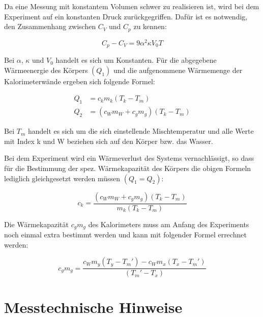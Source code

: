 Da eine Messung mit konstantem Volumen schwer zu realisieren ist, wird bei dem
Experiment auf ein konstanten Druck zurückgegriffen. Dafür ist es notwendig, den
Zusammenhang zwischen $C_V$ und $C_p$ zu kennen:

\begin{equation}
  \label{eqn:Cp-CV}
  C_p - C_V = 9 \alpha^2 \kappa V_0 T
\end{equation}

Bei $\alpha$, $\kappa$ und $V_0$ handelt es sich um Konstanten. Für die abgegebene
Wärmeenergie des Körpers $(Q_1)$ und die aufgenommene Wärmemenge der Kalorimeterwände
ergeben sich folgende Formel:

\begin{align}
  Q_1 &= c_k m_k (T_k - T_m) \\
  Q_2 &= (c_W m_W + c_g m_g) (T_k - T_m)
\end{align}

Bei $T_m$ handelt es sich um die sich einstellende Mischtemperatur und alle Werte
mit Index k und W beziehen sich auf den Körper bzw. das Wasser.

Bei dem Experiment wird ein Wärmeverlust des Systems vernachlässigt, so dass
für die Bestimmung der spez. Wärmekapazität des Körpers die obigen Formeln
lediglich gleichgesetzt werden müssen $(Q_1=Q_2)$:

\begin{equation}
  \label{eqn:ck}
  c_k = \frac{(c_W m_W + c_g m_g) (T_k - T_m)}{m_k (T_k - T_m)}
\end{equation}

Die Wärmekapazität $c_g m_g$ des Kalorimeters muss am Anfang des Experiments
noch einmal extra bestimmt werden und kann mit folgender Formel errechnet werden:

\begin{equation}
  \label{eqn:cgmg}
  c_g m_g = \frac{c_W m_y \left(T_y - T_m' \right) - c_W m_x \left(T_x - T_m' \right)}{\left( T_m' - T_x \right)}
\end{equation}


\section{Messtechnische Hinweise}

